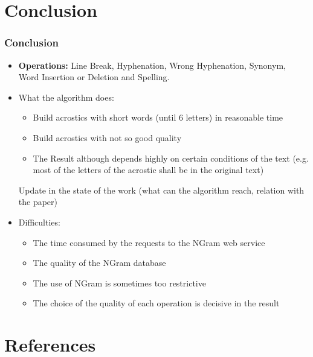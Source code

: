 \documentclass{beamer}
\begin{document}
\section{Conclusion}

\begin{frame}
\frametitle{Conclusion}
\begin{itemize}
\item \textbf{Operations: } Line Break, Hyphenation, Wrong Hyphenation, Synonym, Word Insertion or Deletion and Spelling.
\item What the algorithm does:
	\begin{itemize}
	\item Build acrostics with short words (until 6 letters) in reasonable time
	\item Build acrostics with not so good quality
	\item The Result although depends highly on certain conditions of the text (e.g. most of the letters of the acrostic shall be in the original text)
	\end{itemize}Update in the state of the work (what can the algorithm reach, relation with the paper)
\item Difficulties:
	\begin{itemize}
	\item The time consumed by the requests to the NGram web service
	\item The quality of the NGram database
	\item The use of NGram is sometimes too restrictive
	\item The choice of the quality of each operation is decisive in the result
	\end{itemize}
\end{itemize}
\end{frame}

\section{References}
\end{document}
